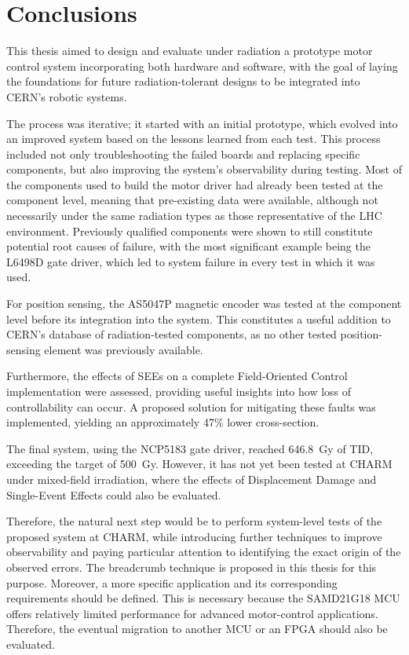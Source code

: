 \chapter{Conclusions}
\label{chapter:conclusions}

This thesis aimed to design and evaluate under radiation a prototype motor control system incorporating both hardware and software, with the goal of laying the foundations for future radiation-tolerant designs to be integrated into CERN's robotic systems.

The process was iterative; it started with an initial prototype, which evolved into an improved system based on the lessons learned from each test. This process included not only troubleshooting the failed boards and replacing specific components, but also improving the system's observability during testing. Most of the components used to build the motor driver had already been tested at the component level, meaning that pre-existing data were available, although not necessarily under the same radiation types as those representative of the LHC environment. Previously qualified components were shown to still constitute potential root causes of failure, with the most significant example being the L6498D gate driver, which led to system failure in every test in which it was used.

For position sensing, the AS5047P magnetic encoder was tested at the component level before its integration into the system. This constitutes a useful addition to CERN's database of radiation-tested components, as no other tested position-sensing element was previously available.

Furthermore, the effects of SEEs on a complete Field-Oriented Control implementation were assessed, providing useful insights into how loss of controllability can occur. A proposed solution for mitigating these faults was implemented, yielding an approximately 47\% lower cross-section.

The final system, using the NCP5183 gate driver, reached 646.8~Gy of TID, exceeding the target of 500~Gy. However, it has not yet been tested at CHARM under mixed-field irradiation, where the effects of Displacement Damage and Single-Event Effects could also be evaluated.

Therefore, the natural next step would be to perform system-level tests of the proposed system at CHARM, while introducing further techniques to improve observability and paying particular attention to identifying the exact origin of the observed errors. The breadcrumb technique is proposed in this thesis for this purpose. Moreover, a more specific application and its corresponding requirements should be defined. This is necessary because the SAMD21G18 MCU offers relatively limited performance for advanced motor-control applications. Therefore, the eventual migration to another MCU or an FPGA should also be evaluated.